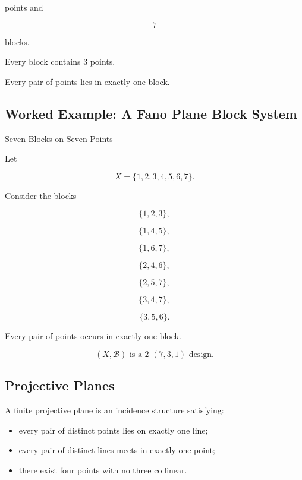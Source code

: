 points and

\[
7
\]

blocks.

Every block contains \(3\) points.

Every pair of points lies in exactly one block.

\subsection{Worked Example: A Fano Plane Block System}
\label{subsec:worked-fano-blocks}

\begin{workedexamplebox}{Seven Blocks on Seven Points}

Let

\[
X=\{1,2,3,4,5,6,7\}.
\]

Consider the blocks

\[
\{1,2,3\},
\]

\[
\{1,4,5\},
\]

\[
\{1,6,7\},
\]

\[
\{2,4,6\},
\]

\[
\{2,5,7\},
\]

\[
\{3,4,7\},
\]

\[
\{3,5,6\}.
\]

Every pair of points occurs in exactly one block.

\begin{answerbox}
\[
\boxed{
(X,\mathcal{B})
\text{ is a }2\text{-}(7,3,1)\text{ design}.
}
\]
\end{answerbox}

\end{workedexamplebox}

\subsection{Projective Planes}
\label{subsec:projective-planes-design}

A finite projective plane is an incidence structure satisfying:

\begin{itemize}
    \item every pair of distinct points lies on exactly one line;
    \item every pair of distinct lines meets in exactly one point;
    \item there exist four points with no three collinear.
\end{itemize}


